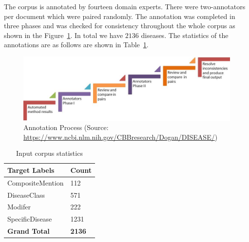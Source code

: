 The corpus is annotated by fourteen domain experts. There were two-annotators per document which were paired randomly. The annotation was completed in three phases and was checked for consistency throughout the whole corpus as shown in the Figure~\ref{fig:annotationdetails}. In total we have $2136$ diseases. The statistics of the annotations are as follows are shown in Table~\ref{table: input_stats}. 

\begin{figure}[ht]
    \centering
    \includegraphics[scale=0.5]{Figures/annotationprocess.png}
    \caption{Annotation Process (Source: \url{https://www.ncbi.nlm.nih.gov/CBBresearch/Dogan/DISEASE/})}
    \label{fig:annotationdetails}
\end{figure}

\begin{table}[ht]
\caption{Input corpus statistics}
\label{table: input_stats}
\centering
\begin{tabular}{|l|l|}
\hline
\textbf{Target Labels} & \textbf{Count} \\ \hline
CompositeMention       & 112            \\ \hline
DiseaseClass           & 571            \\ \hline
Modifer                & 222            \\ \hline
SpecificDisease        & 1231           \\ \hline
\textbf{Grand Total}   & \textbf{2136}  \\ \hline
\end{tabular}
\end{table}


